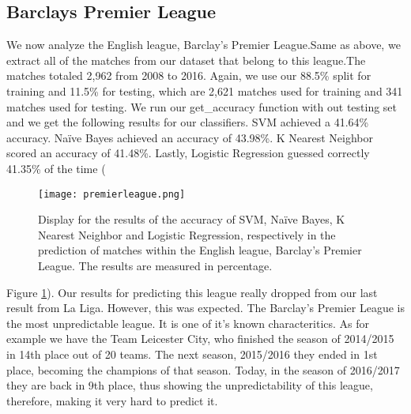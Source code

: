 \documentclass[10pt,journal,compsoc]{IEEEtran}
\begin{document}
\subsection{Barclays Premier League}
We now analyze the English league, Barclay’s Premier League.Same as above, we extract all of the matches from our dataset that belong to this league.The matches totaled 2,962 from 2008 to 2016. Again, we use our 88.5\% split for training and 11.5\% for testing, which are 2,621 matches used for training and 341 matches used for testing. We run our get\_accuracy function with out testing set and we get the following results for our classifiers. SVM achieved a 41.64\% accuracy. Naïve Bayes achieved an accuracy of 43.98\%. K Nearest Neighbor scored an accuracy of 41.48\%. Lastly, Logistic Regression guessed correctly 41.35\% of the time (\begin{figure}
  \texttt{[image: premierleague.png]}
  \caption{Display for the results of the accuracy of SVM, Naïve Bayes, K Nearest Neighbor and Logistic Regression, respectively in the prediction of matches within the English league, Barclay’s Premier League. The results are measured in percentage.}
  \label{fig:premierleague}
\end{figure}
Figure \ref{fig:premierleague}). Our results for predicting this league really dropped from our last result from La Liga. However, this was expected. The Barclay’s Premier League is the most unpredictable league. It is one of it’s known characteritics. As for example we have the Team Leicester City, who finished the season of 2014/2015 in 14th place out of 20 teams. The next season, 2015/2016 they ended in 1st place, becoming the champions of that season. Today, in the season of 2016/2017 they are back in 9th place, thus showing the unpredictability of this league, therefore, making it very hard to predict it.
\end{document}
